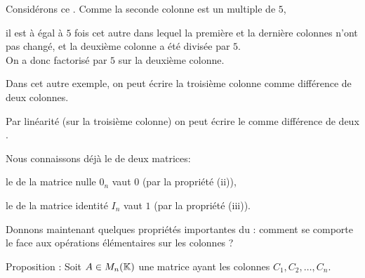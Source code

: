 \diapo

Considérons ce \deter.  Comme la seconde colonne est un multiple de $5$,

\change
il est à égal à $5$ fois cet autre \deter
dans lequel la première et la dernière colonnes n'ont pas changé, 
et la deuxième colonne a été divisée par $5$. \\
On a donc factorisé par $5$ sur la deuxième colonne.

\change
Dans cet autre exemple, on peut écrire la troisième colonne comme différence de deux colonnes.

\change
Par linéarité (sur la troisième colonne) on peut écrire
le \deter comme différence de deux \deters.
%

\diapo
Nous connaissons déjà le \deter de deux matrices: 

\change
le \deter de la matrice nulle $0_n$ vaut $0$ (par la propriété (ii)),

\change
le \deter de la matrice identité $I_n$ vaut $1$ (par la propriété (iii)).

Donnons maintenant quelques propriétés importantes du \deter: comment se comporte le \deter face aux opérations élémentaires sur les colonnes ?

\change
Proposition : Soit $A \in M_n(\mathbb{K})$ une matrice ayant les colonnes $C_1, C_2, \ldots, C_n$.


